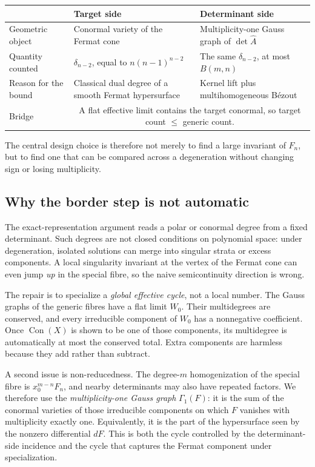 \documentclass[acmsmall,screen,nonacm]{acmart}
\theoremstyle{definition}
\theoremstyle{remark}
\DeclareMathOperator{\Con}{Con}
\newcommand{\pdeg}{\delta}
\newcommand{\Gone}{\Gamma_{\!1}}
\begin{document}
\begin{center}
\small
\begin{tabularx}{\textwidth}{@{}p{}X X@{}}
\toprule
& Target side & Determinant side \\
\midrule
Geometric object & Conormal variety of the Fermat cone &
Multiplicity-one Gauss graph of $\det\widehat A$ \\
Quantity counted & $\pdeg_{n-2}$, equal to $n(n-1)^{n-2}$ &
The same $\pdeg_{n-2}$, at most $B(m,n)$ \\
Reason for the bound & Classical dual degree of a smooth Fermat hypersurface &
Kernel lift plus multihomogeneous B\'ezout \\
Bridge & \multicolumn{2}{c}{A flat effective limit contains the target conormal, so target count $\le$ generic count.} \\
\bottomrule
\end{tabularx}
\end{center}

The central design choice is therefore not merely to find a large invariant of
$F_n$, but to find one that can be compared across a degeneration without
changing sign or losing multiplicity.

\subsection{Why the border step is not automatic}

The exact-representation argument reads a polar or conormal degree from a fixed determinant.  Such degrees are not closed conditions on polynomial space: under degeneration, isolated solutions can merge into singular strata or excess components.  A local singularity invariant at the vertex of the Fermat cone can even jump \emph{up} in the special fibre, so the naive semicontinuity direction is wrong.

The repair is to specialize a \emph{global effective cycle}, not a local number.  The Gauss graphs of the generic fibres have a flat limit $W_0$.  Their multidegrees are conserved, and every irreducible component of $W_0$ has a nonnegative coefficient.  Once $\Con(X)$ is shown to be one of those components, its multidegree is automatically at most the conserved total.  Extra components are harmless because they add rather than subtract.

A second issue is non-reducedness.  The degree-$m$ homogenization of the special fibre is $x_0^{m-n}F_n$, and nearby determinants may also have repeated factors.  We therefore use the \emph{multiplicity-one Gauss graph} $\Gone(F)$: it is the sum of the conormal varieties of those irreducible components on which $F$ vanishes with multiplicity exactly one.  Equivalently, it is the part of the hypersurface seen by the nonzero differential $dF$.  This is both the cycle controlled by the determinant-side incidence and the cycle that captures the Fermat component under specialization.
\end{document}
